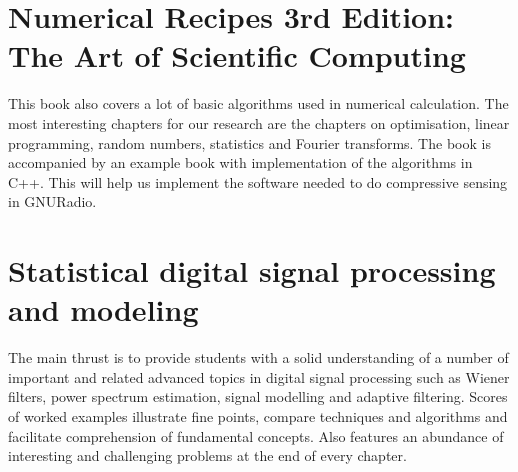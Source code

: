 \documentclass[report, oneside, a4paper, openany]{memoir}
\begin{document}
\section{Numerical Recipes 3rd Edition: The Art of Scientific Computing \cite{press2007numerical}}
This book also covers a lot of basic algorithms used in numerical calculation. The most interesting chapters for our research are the chapters on optimisation, linear programming, random numbers, statistics and Fourier transforms.  The book is accompanied by an example book with implementation of the algorithms in C++. This will help us implement the software needed to do compressive sensing in GNURadio.
\section{Statistical digital signal processing and modeling \cite{hayes1996statistical}}
The main thrust is to provide students with a solid understanding of a number of important and related advanced topics in digital signal processing such as Wiener filters, power spectrum estimation, signal modelling and adaptive filtering. Scores of worked examples illustrate fine points, compare techniques and algorithms and facilitate comprehension of fundamental concepts. Also features an abundance of interesting and challenging problems at the end of every chapter.
\end{document}
